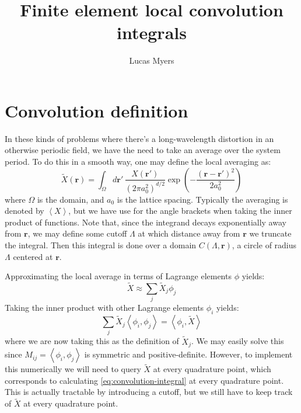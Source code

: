 \documentclass[reqno]{article}
\begin{document}
\title{Finite element local convolution integrals}
\author{Lucas Myers}
\maketitle

\section{Convolution definition}

In these kinds of problems where there's a long-wavelength distortion in an otherwise periodic field, we have the need to take an average over the system period.
To do this in a smooth way, one may define the local averaging as:
\begin{equation} \label{eq:convolution-integral}
    \tilde{X} (\mathbf{r})
    =
    \int_\Omega d\mathbf{r}' \, 
    \frac{X(\mathbf{r}')}{\left( 2 \pi a_0^2 \right)^{d/2}}
    \exp\left( 
        - \frac{ \left( \mathbf{r} - \mathbf{r}' \right)^2 }{2 a_0^2}
    \right)
\end{equation}
where $\Omega$ is the domain, and $a_0$ is the lattice spacing.
Typically the averaging is denoted by $\left< X \right>$, but we have use for the angle brackets when taking the inner product of functions.
Note that, since the integrand decays exponentially away from $\mathbf{r}$, we may define some cutoff $\Lambda$ at which distance away from $\mathbf{r}$ we truncate the integral.
Then this integral is done over a domain $C(\Lambda, \mathbf{r})$, a circle of radius $\Lambda$ centered at $\mathbf{r}$.

Approximating the local average in terms of Lagrange elements $\phi$ yields:
\begin{equation}
    \tilde{X}
    \approx
    \sum_j \tilde{X}_j \phi_j
\end{equation}
Taking the inner product with other Lagrange elements $\phi_i$ yields:
\begin{equation}
    \sum_j \tilde{X}_j \left< \phi_i, \phi_j\right>
    =
    \left< \phi_i, \tilde{X}\right>
\end{equation}
where we are now taking this as the definition of $\tilde{X}_j$.
We may easily solve this since $M_{ij} = \left< \phi_i, \phi_j \right>$ is symmetric and positive-definite.
However, to implement this numerically we will need to query $\tilde{X}$ at every quadrature point, which corresponds to calculating \eqref{eq:convolution-integral} at every quadrature point.
This is actually tractable by introducing a cutoff, but we still have to keep track of $\tilde{X}$ at every quadrature point.
\end{document}
